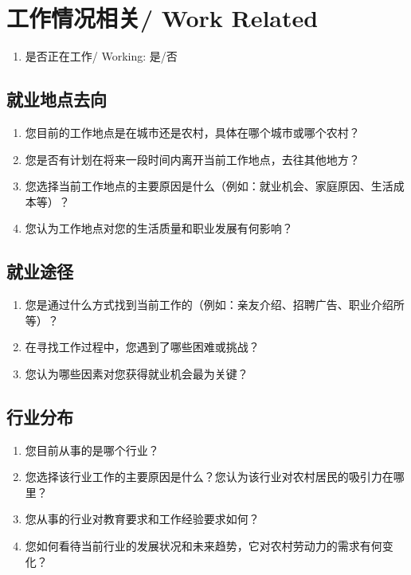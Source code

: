 \documentclass[12pt]{article}
\begin{document}
\section{工作情况相关/ Work Related}
\begin{enumerate}
    \item 是否正在工作/ Working: 是/否

\end{enumerate}

\subsection*{就业地点去向}
\begin{enumerate}
    \item 您目前的工作地点是在城市还是农村，具体在哪个城市或哪个农村？
    \item 您是否有计划在将来一段时间内离开当前工作地点，去往其他地方？
    \item 您选择当前工作地点的主要原因是什么（例如：就业机会、家庭原因、生活成本等）？
    \item 您认为工作地点对您的生活质量和职业发展有何影响？
\end{enumerate}

\subsection*{就业途径}
\begin{enumerate}
    \item 您是通过什么方式找到当前工作的（例如：亲友介绍、招聘广告、职业介绍所等）？
    \item 在寻找工作过程中，您遇到了哪些困难或挑战？
    \item 您认为哪些因素对您获得就业机会最为关键？
\end{enumerate}

\subsection*{行业分布}
\begin{enumerate}
    \item 您目前从事的是哪个行业？
    \item 您选择该行业工作的主要原因是什么？您认为该行业对农村居民的吸引力在哪里？
    \item 您从事的行业对教育要求和工作经验要求如何？
    \item 您如何看待当前行业的发展状况和未来趋势，它对农村劳动力的需求有何变化？
\end{enumerate}
\end{document}
